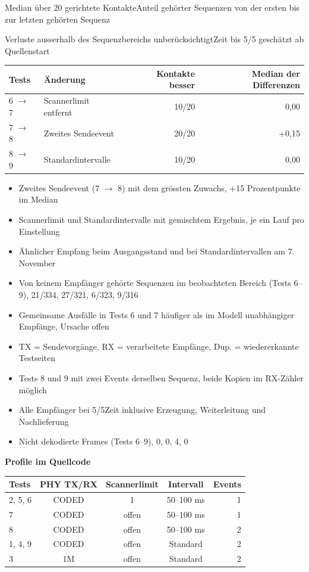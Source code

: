 \documentclass[a4paper,11pt]{article}
\begin{document}
{\small Median über 20 gerichtete Kontakte\enspace\textbullet\enspace Anteil gehörter Sequenzen von der ersten bis zur letzten gehörten Sequenz\par Verluste ausserhalb des Sequenzbereichs unberücksichtigt\enspace\textbullet\enspace Zeit bis 5/5 geschätzt ab Quellenstart}

\begin{center}
\small
\begin{tabular}{llrr}\toprule
Tests & Änderung & Kontakte besser & Median der Differenzen \\ \midrule
6 $\to$ 7 & Scannerlimit entfernt & 10/20 & 0,00 \\
7 $\to$ 8 & Zweites Sendeevent & 20/20 & +0,15 \\
8 $\to$ 9 & Standardintervalle & 10/20 & 0,00 \\
\bottomrule\end{tabular}
\end{center}

\begin{itemize}
\item Zweites Sendeevent (7 $\to$ 8) mit dem grössten Zuwachs, +15 Prozentpunkte im Median
\item Scannerlimit und Standardintervalle mit gemischtem Ergebnis, je ein Lauf pro Einstellung
\item Ähnlicher Empfang beim Ausgangsstand und bei Standardintervallen am 7. November
\item Von keinem Empfänger gehörte Sequenzen im beobachteten Bereich (Tests 6--9), 21/334, 27/321, 6/323, 9/316
\item Gemeinsame Ausfälle in Tests 6 und 7 häufiger als im Modell unabhängiger Empfänge, Ursache offen
\item TX = Sendevorgänge, RX = verarbeitete Empfänge, Dup. = wiedererkannte Testseiten
\item Tests 8 und 9 mit zwei Events derselben Sequenz, beide Kopien im RX-Zähler möglich
\item Alle Empfänger bei 5/5\enspace\textbullet\enspace Zeit inklusive Erzeugung, Weiterleitung und Nachlieferung
\item Nicht dekodierte Frames (Tests 6--9), 0, 0, 4, 0
\end{itemize}

\textbf{Profile im Quellcode}

\begin{center}
\small
\begin{tabular}{lcccr}\toprule
Tests & PHY TX/RX & Scannerlimit & Intervall & Events \\ \midrule
2, 5, 6 & CODED & 1 & 50--100 ms & 1 \\
7 & CODED & offen & 50--100 ms & 1 \\
8 & CODED & offen & 50--100 ms & 2 \\
1, 4, 9 & CODED & offen & Standard & 2 \\
3 & 1M & offen & Standard & 2 \\
\bottomrule\end{tabular}
\end{center}
\end{document}
